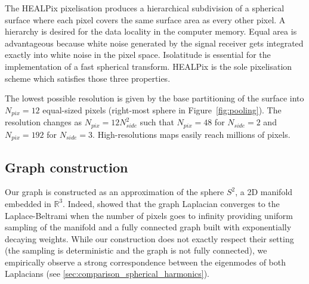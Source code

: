 \documentclass[final,twocolumn,3p,times,sort&compress]{elsarticle}
\newcommand{\figref}[1]{Figure~\ref{fig:#1}}
\newcommand{\1}{\b{1}}              %
\newcommand{\0}{\b{0}}              %
\begin{document}
The HEALPix pixelisation produces a hierarchical subdivision of a spherical surface where each pixel covers the same surface area as every other pixel.
A hierarchy is desired for the data locality in the computer memory.
Equal area is advantageous because white noise generated by the signal receiver gets integrated exactly into white noise in the pixel space.
Isolatitude is essential for the implementation of a fast spherical transform.
HEALPix is the sole pixelisation scheme which satisfies those three properties.

The lowest possible resolution is given by the base partitioning of the surface into $N_{pix} = 12$ equal-sized pixels (right-most sphere in \figref{pooling}).
The resolution changes as $N_{pix} = 12 N^2_{side}$ such that $N_{pix} = 48$ for $N_{side} = 2$ and $N_{pix} = 192$ for $N_{side} = 3$.
High-resolutions maps easily reach millions of pixels.

\subsection{Graph construction}

Our graph is constructed as an approximation of the sphere $S^2$, a 2D manifold embedded in $\mathbb{R}^3$.
Indeed, \citep{belkin2007convergence} showed that the graph Laplacian converges to the Laplace-Beltrami when the number of pixels goes to infinity providing uniform sampling of the manifold and a fully connected graph built with exponentially decaying weights.
While our construction does not exactly respect their setting (the sampling is deterministic and the graph is not fully connected), we empirically observe a strong correspondence between the eigenmodes of both Laplacians (see \ref{sec:comparison_spherical_harmonics}).
\end{document}
